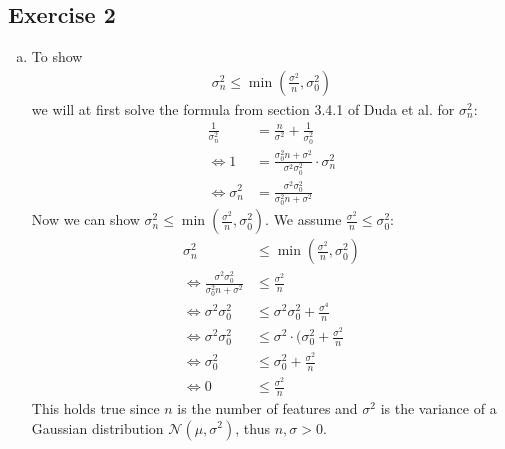 \documentclass[10pt,a4paper]{article}
\begin{document}
\subsection*{Exercise 2}
\begin{enumerate}[(a)]
\item
To show
\begin{align*}
\sigma_{n}^2 \le \min{(\frac{\sigma^2}{n},\sigma_{0}^2)}
\end{align*}
we will at first solve the formula from section 3.4.1 of Duda et al. for $\sigma_{n}^2$:
\begin{align*}
    \frac{1}{\sigma_{n}^2} &= \frac{n}{\sigma^2}+ \frac{1}{\sigma_{0}^2}\\
    \Leftrightarrow 1 &= \frac{\sigma_{0}^2n+\sigma^2}{\sigma^2\sigma_{0}^2} \cdot \sigma_{n}^2\\
    \Leftrightarrow \sigma_{n}^2 &= \frac{\sigma^2\sigma_{0}^2}{\sigma_{0}^2n+\sigma^2}
\end{align*}
Now we can show $\sigma_{n}^2 \le \min{(\frac{\sigma^2}{n},\sigma_{0}^2)}$. We assume $\frac{\sigma^2}{n} \le \sigma_{0}^2$:
\begin{align*}
    \sigma_{n}^2 &\le \min{(\frac{\sigma^2}{n},\sigma_{0}^2)} \\
    \Leftrightarrow \frac{\sigma^2\sigma_{0}^2}{\sigma_{0}^2n+\sigma^2} &\le \frac{\sigma^2}{n}\\
    \Leftrightarrow \sigma^2\sigma_{0}^2 &\le \sigma^2\sigma_{0}^2 + \frac{\sigma^4}{n}\\
    \Leftrightarrow \sigma^2\sigma_{0}^2 &\le \sigma^2 \cdot (\sigma_{0}^2 + \frac{\sigma^2}{n}\\
    \Leftrightarrow \sigma_{0}^2 &\le \sigma_{0}^2 + \frac{\sigma^2}{n}\\
    \Leftrightarrow 0 &\le \frac{\sigma^2}{n}
\end{align*}
This holds true since $n$ is the number of features and $\sigma^2$ is the variance of a Gaussian distribution $\mathcal{N}(\mu,\sigma^2)$, thus $n, \sigma > 0$.


\end{enumerate}
\end{document}
